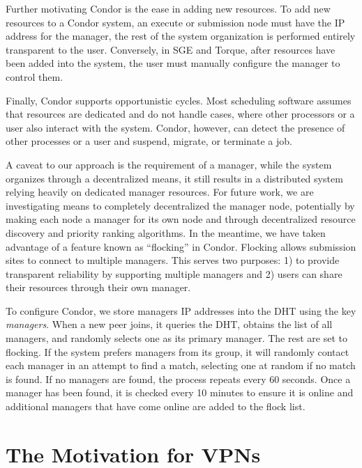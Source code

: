 \documentclass[conference]{IEEEtran}
\begin{document}
Further motivating Condor is the ease in adding new resources.  To add new
resources to a Condor system, an execute or submission node must have the IP
address for the manager, the rest of the system organization is performed
entirely transparent to the user.  Conversely, in SGE and Torque, after
resources have been added into the system, the user must manually configure the
manager to control them.

Finally, Condor supports opportunistic cycles.  Most scheduling software
assumes that resources are dedicated and do not handle cases, where other
processors or a user also interact with the system.  Condor, however, can
detect the presence of other processes or a user and suspend, migrate, or
terminate a job.

A caveat to our approach is the requirement of a manager, while the system
organizes through a decentralized means, it still results in a distributed
system relying heavily on dedicated manager resources.  For future work, we are
investigating means to completely decentralized the manager node, potentially
by making each node a manager for its own node and through decentralized
resource discovery and priority ranking algorithms.  In the meantime, we have
taken advantage of a feature known as ``flocking'' in Condor.  Flocking allows
submission sites to connect to multiple managers.  This serves two purposes: 1)
to provide transparent reliability by supporting multiple managers and 2) users
can share their resources through their own manager.  

To configure Condor, we store managers IP addresses into the DHT using the key
\emph{managers}.  When a new peer joins, it queries the DHT, obtains the list
of all managers, and randomly selects one as its primary manager.  The rest are
set to flocking.  If the system prefers managers from its group, it will
randomly contact each manager in an attempt to find a match, selecting one at
random if no match is found.  If no managers are found, the process repeats
every 60 seconds.  Once a manager has been found, it is checked every 10
minutes to ensure it is online and additional managers that have come online
are added to the flock list.

\section{The Motivation for VPNs}
\label{vpns}
\end{document}

